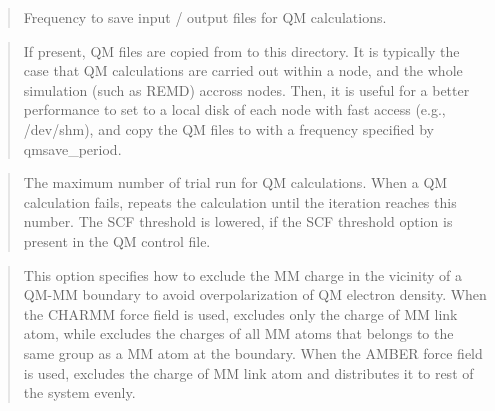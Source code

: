 \documentclass[a4paper,11pt,oneside,english]{sphinxmanual}
\begin{document}
 
\begin{quote}


Frequency to save input / output files for QM calculations.
\end{quote}

 
\begin{quote}


If present, QM files are copied from  to this directory.
It is typically the case that QM calculations are carried out
within a node, and the whole simulation (such as REMD) accross
nodes. Then, it is useful for a better performance to set
 to a local disk of each node with fast access (e.g.,
/dev/shm), and copy the QM files to  with a frequency
specified by qmsave\_period.
\end{quote}

 
\begin{quote}


The maximum number of trial run for QM calculations.
When a QM calculation fails,  repeats the calculation until
the iteration reaches this number. The SCF threshold is lowered, if
the SCF threshold option is present in the QM control file.
\end{quote}

 
\begin{quote}


This option specifies how to exclude the MM charge in the vicinity of a
QM-MM boundary to avoid overpolarization of QM electron density.  When
the CHARMM force field is used,  excludes only the charge of MM
link atom, while  excludes the charges of all MM atoms that
belongs to the same group as a MM atom at the boundary. When the AMBER
force field is used,  excludes the charge of MM link atom and
distributes it to rest of the system evenly.
\end{quote}
\end{document}
